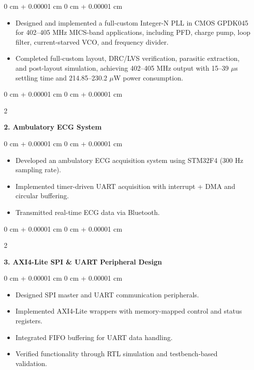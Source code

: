 \documentclass[10pt, letterpaper]{article}
\newenvironment{highlights}{
    \begin{itemize}[
        topsep=0.10 cm,
        parsep=0.10 cm,
        partopsep=0pt,
        itemsep=0pt,
        leftmargin=0 cm + 10pt
    ]
}{
    \end{itemize}
} %
\newenvironment{onecolentry}{
    \begin{adjustwidth}{
        0 cm + 0.00001 cm
    }{
        0 cm + 0.00001 cm
    }
}{
    \end{adjustwidth}
} %
\newenvironment{twocolentry}[2][]{
    \onecolentry
    \def\secondColumn{#2}
    \setcolumnwidth{\fill, 4.5 cm}
    \begin{paracol}{2}
}{
    \switchcolumn \raggedleft \secondColumn
    \end{paracol}
    \endonecolentry
} %
\begin{document}
    \vspace{0.10 cm}
    \begin{onecolentry}
        \begin{highlights}
            \item Designed and implemented a full-custom Integer-N PLL in CMOS GPDK045 for 402--405 MHz MICS-band applications, including PFD, charge pump, loop filter, current-starved VCO, and frequency divider.  
            \item Completed full-custom layout, DRC/LVS verification, parasitic extraction, and post-layout simulation, achieving 402--405 MHz output with 15--39 $\mu$s settling time and 214.85--230.2 $\mu$W power consumption.
        \end{highlights}
    \end{onecolentry}
    
    \vspace{0.3cm}

    \begin{twocolentry}{}
        \textbf{2. Ambulatory ECG System }
    \end{twocolentry}
    
    \vspace{0.10 cm}
    \begin{onecolentry}
        \begin{highlights}
            \item Developed an ambulatory ECG acquisition system using STM32F4 (300 Hz sampling rate).  
            \item Implemented timer-driven UART acquisition with interrupt + DMA and circular buffering.  
            \item Transmitted real-time ECG data via Bluetooth.  
        \end{highlights}
    \end{onecolentry}
        
    \vspace{0.3cm}
    
    \begin{twocolentry}{}
        \textbf{3. AXI4-Lite SPI \& UART Peripheral Design}
    \end{twocolentry}
    
    \vspace{0.30cm}
    
    \begin{onecolentry}
        \begin{highlights}
            \item Designed SPI master and UART communication peripherals.  
            \item Implemented AXI4-Lite wrappers with memory-mapped control and status registers.  
            \item Integrated FIFO buffering for UART data handling.  
            \item Verified functionality through RTL simulation and testbench-based validation.  
        \end{highlights}
    \end{onecolentry}
    
\end{document}
